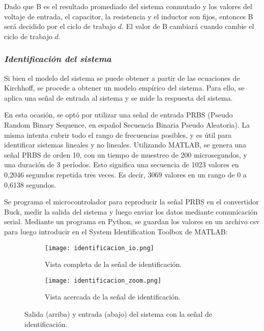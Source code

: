 Dado que B es el resultado promediado del sistema conmutado y los valores del voltaje de entrada,
el capacitor, la resistencia y el inductor son fijos, entonces B será decidido por el ciclo de
trabajo $d$. El valor de B cambiará cuando cambie el ciclo de trabajo $d$.



\subsubsection*{\it{Identificación del sistema}}
\vspace{-0.25cm}
Si bien el modelo del sistema se puede obtener a partir de las ecuaciones de Kirchhoff, se procede
a obtener un modelo empírico del sistema. Para ello, se aplica una señal de entrada al sistema y se
mide la respuesta del sistema.

En esta ocasión, se optó por utilizar una señal de entrada PRBS
(Pseudo Random Binary Sequence, en español Secuencia Binaria Pseudo Aleatoria). La misma intenta
cubrir todo el rango de frecuencias posibles, y es útil para identificar sistemas lineales y no lineales.
Utilizando MATLAB, se genera una señal PRBS de orden 10, con un tiempo de muestreo de 200 microsegundos,
y una duración de 3 períodos. Esto significa una secuencia de 1023 valores en 0,2046 segundos repetida tres veces.
Es decir, 3069 valores en un rango de 0 a 0,6138 segundos.

Se programa el microcontrolador para reproducir la señal PRBS en el convertidor Buck, medir la salida
del sistema y luego enviar los datos mediante comunicación serial. Mediante un programa en Python, se guardan
los valores en un archivo csv para luego introducir en el System Identification Toolbox de MATLAB:


\begin{figure}[H]
    \centering

    \begin{subfigure}[b]{\textwidth}
        \centering
        \texttt{[image: identificacion\_io.png]}
        \caption{Vista completa de la señal de identificación.}
        \label{fig:identificacion_io_gral}
    \end{subfigure}
    \begin{subfigure}[b]{\textwidth}
        \centering
        \texttt{[image: identificacion\_zoom.png]}
        \caption{Vista acercada de la señal de identificación.}
        \label{fig:identificacion_io_zoom}
    \end{subfigure}

    \vspace{-0.25cm}
    \caption{Salida (arriba) y entrada (abajo) del sistema con la señal de identificación.}
    \label{fig:identificacion_io}
\end{figure}
\vspace{-0.5cm}

